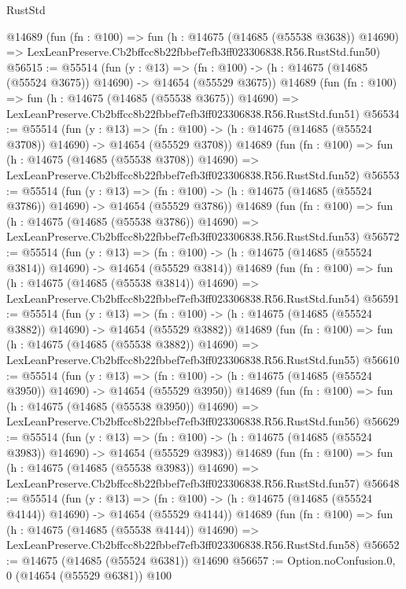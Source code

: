 \begin{lexlean}{RustStd}
\begin{coremodule}
    @14689
    (fun (fn : @100) =>
    fun (h : @14675 (@14685 (@55538 @3638)) @14690) =>
    LexLeanPreserve.Cb2bffcc8b22fbbef7efb3ff023306838.R56.RustStd.fun50)
@56515 := @55514
    (fun (y : @13) =>
    (fn : @100) -> (h : @14675 (@14685 (@55524 @3675)) @14690) -> @14654 (@55529 @3675))
    @14689
    (fun (fn : @100) =>
    fun (h : @14675 (@14685 (@55538 @3675)) @14690) =>
    LexLeanPreserve.Cb2bffcc8b22fbbef7efb3ff023306838.R56.RustStd.fun51)
@56534 := @55514
    (fun (y : @13) =>
    (fn : @100) -> (h : @14675 (@14685 (@55524 @3708)) @14690) -> @14654 (@55529 @3708))
    @14689
    (fun (fn : @100) =>
    fun (h : @14675 (@14685 (@55538 @3708)) @14690) =>
    LexLeanPreserve.Cb2bffcc8b22fbbef7efb3ff023306838.R56.RustStd.fun52)
@56553 := @55514
    (fun (y : @13) =>
    (fn : @100) -> (h : @14675 (@14685 (@55524 @3786)) @14690) -> @14654 (@55529 @3786))
    @14689
    (fun (fn : @100) =>
    fun (h : @14675 (@14685 (@55538 @3786)) @14690) =>
    LexLeanPreserve.Cb2bffcc8b22fbbef7efb3ff023306838.R56.RustStd.fun53)
@56572 := @55514
    (fun (y : @13) =>
    (fn : @100) -> (h : @14675 (@14685 (@55524 @3814)) @14690) -> @14654 (@55529 @3814))
    @14689
    (fun (fn : @100) =>
    fun (h : @14675 (@14685 (@55538 @3814)) @14690) =>
    LexLeanPreserve.Cb2bffcc8b22fbbef7efb3ff023306838.R56.RustStd.fun54)
@56591 := @55514
    (fun (y : @13) =>
    (fn : @100) -> (h : @14675 (@14685 (@55524 @3882)) @14690) -> @14654 (@55529 @3882))
    @14689
    (fun (fn : @100) =>
    fun (h : @14675 (@14685 (@55538 @3882)) @14690) =>
    LexLeanPreserve.Cb2bffcc8b22fbbef7efb3ff023306838.R56.RustStd.fun55)
@56610 := @55514
    (fun (y : @13) =>
    (fn : @100) -> (h : @14675 (@14685 (@55524 @3950)) @14690) -> @14654 (@55529 @3950))
    @14689
    (fun (fn : @100) =>
    fun (h : @14675 (@14685 (@55538 @3950)) @14690) =>
    LexLeanPreserve.Cb2bffcc8b22fbbef7efb3ff023306838.R56.RustStd.fun56)
@56629 := @55514
    (fun (y : @13) =>
    (fn : @100) -> (h : @14675 (@14685 (@55524 @3983)) @14690) -> @14654 (@55529 @3983))
    @14689
    (fun (fn : @100) =>
    fun (h : @14675 (@14685 (@55538 @3983)) @14690) =>
    LexLeanPreserve.Cb2bffcc8b22fbbef7efb3ff023306838.R56.RustStd.fun57)
@56648 := @55514
    (fun (y : @13) =>
    (fn : @100) -> (h : @14675 (@14685 (@55524 @4144)) @14690) -> @14654 (@55529 @4144))
    @14689
    (fun (fn : @100) =>
    fun (h : @14675 (@14685 (@55538 @4144)) @14690) =>
    LexLeanPreserve.Cb2bffcc8b22fbbef7efb3ff023306838.R56.RustStd.fun58)
@56652 := @14675 (@14685 (@55524 @6381)) @14690
@56657 := Option.noConfusion.{0, 0} (@14654 (@55529 @6381)) @100

\end{coremodule}
\end{lexlean}
